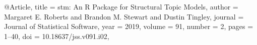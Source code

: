 @Article{,
  title = {{stm}: An {R} Package for Structural Topic Models},
  author = {Margaret E. Roberts and Brandon M. Stewart and Dustin Tingley},
  journal = {Journal of Statistical Software},
  year = {2019},
  volume = {91},
  number = {2},
  pages = {1--40},
  doi = {10.18637/jss.v091.i02},
}
